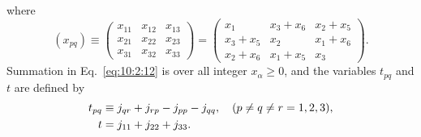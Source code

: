 where
\begin{equation}
\left(x_{p q}\right) \equiv\left(\begin{array}{lll}
x_{11} & x_{12} & x_{13}  \label{eq:10:2:13}\\
x_{21} & x_{22} & x_{23} \\
x_{31} & x_{32} & x_{33}
\end{array}\right)=\left(\begin{array}{ccc}
x_{1} & x_{3}+x_{6} & x_{2}+x_{5} \\
x_{3}+x_{5} & x_{2} & x_{1}+x_{6} \\
x_{2}+x_{6} & x_{1}+x_{5} & x_{3}
\end{array}\right).
\end{equation}
Summation in Eq.~\eqref{eq:10:2:12} is over all integer $x_{\alpha} \geq 0$, and the variables $t_{p q}$ and $t$ are defined by
\begin{align}
t_{p q} & \equiv j_{q r}+j_{r p}-j_{p p}-j_{q q}, \quad(p \neq q \neq r=1,2,3),  \label{eq:10:2:14}\\
t & =j_{11}+j_{22}+j_{33}. \notag
\end{align}
